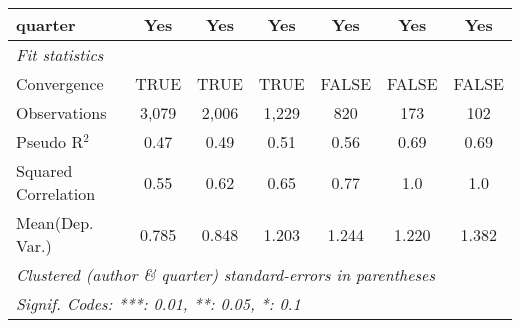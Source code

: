 \begin{tabular}{lcccccc}
   quarter                                                    & Yes           & Yes          & Yes           & Yes           & Yes           & Yes\\  
   \midrule
   \emph{Fit statistics}\\
   Convergence                                                &TRUE           & TRUE         & TRUE          & FALSE         & FALSE         & FALSE\\  
   Observations                                               & 3,079         & 2,006        & 1,229         & 820           & 173           & 102\\  
   Pseudo R$^2$                                               & 0.47          & 0.49         & 0.51          & 0.56          & 0.69          & 0.69\\  
   Squared Correlation                                        & 0.55          & 0.62         & 0.65          & 0.77          & 1.0           & 1.0\\  
Mean(Dep. Var.) & 0.785 & 0.848 & 1.203 & 1.244 & 1.220 & 1.382 \\
   \midrule \midrule
   \multicolumn{7}{l}{\emph{Clustered (author \& quarter) standard-errors in parentheses}}\\
   \multicolumn{7}{l}{\emph{Signif. Codes: ***: 0.01, **: 0.05, *: 0.1}}\\
\end{tabular}
\par\endgroup
